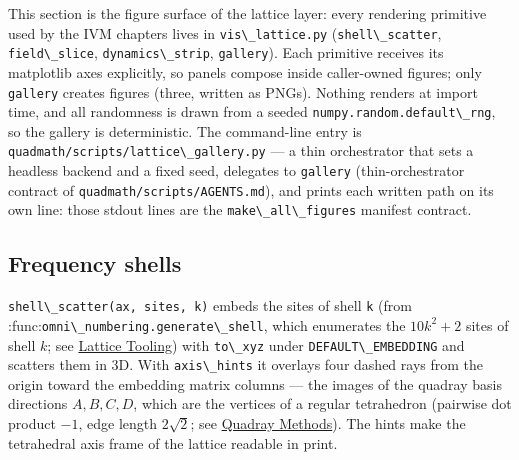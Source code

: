 \documentclass[
  10pt,
]{article}
\newcommand{\passthrough}[1]{#1}
\begin{document}
This section is the figure surface of the lattice layer: every rendering
primitive used by the IVM chapters lives in
\passthrough{\lstinline!vis\_lattice.py!}
(\passthrough{\lstinline!shell\_scatter!},
\passthrough{\lstinline!field\_slice!},
\passthrough{\lstinline!dynamics\_strip!},
\passthrough{\lstinline!gallery!}). Each primitive receives its
matplotlib axes explicitly, so panels compose inside caller-owned
figures; only \passthrough{\lstinline!gallery!} creates figures (three,
written as PNGs). Nothing renders at import time, and all randomness is
drawn from a seeded \passthrough{\lstinline!numpy.random.default\_rng!},
so the gallery is deterministic. The command-line entry is
\passthrough{\lstinline!quadmath/scripts/lattice\_gallery.py!} --- a
thin orchestrator that sets a headless backend and a fixed seed,
delegates to \passthrough{\lstinline!gallery!} (thin-orchestrator
contract of \passthrough{\lstinline!quadmath/scripts/AGENTS.md!}), and
prints each written path on its own line: those stdout lines are the
\passthrough{\lstinline!make\_all\_figures!} manifest contract.

\subsection{Frequency shells}\label{frequency-shells}

\passthrough{\lstinline!shell\_scatter(ax, sites, k)!} embeds the sites
of shell \passthrough{\lstinline!k!} (from
:func:\passthrough{\lstinline!omni\_numbering.generate\_shell!}, which
enumerates the \(10k^2 + 2\) sites of shell \(k\); see
\href{13_lattice_tooling.md}{Lattice Tooling}) with
\passthrough{\lstinline!to\_xyz!} under
\passthrough{\lstinline!DEFAULT\_EMBEDDING!} and scatters them in 3D.
With \passthrough{\lstinline!axis\_hints!} it overlays four dashed rays
from the origin toward the embedding matrix columns --- the images of
the quadray basis directions \(A, B, C, D\), which are the vertices of a
regular tetrahedron (pairwise dot product \(-1\), edge length
\(2\sqrt{2}\); see \href{03_quadray_methods.md}{Quadray Methods}). The
hints make the tetrahedral axis frame of the lattice readable in print.
\end{document}

